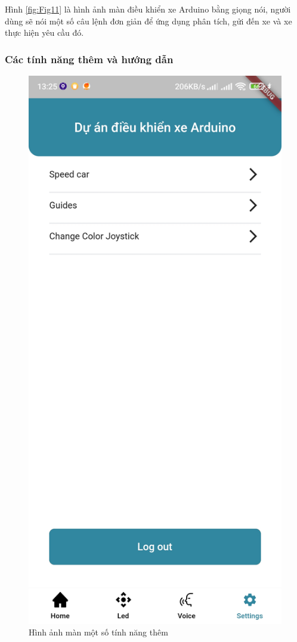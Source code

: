 \documentclass[../DoAn.tex]{subfiles}
\begin{document}
Hình \ref{fig:Fig11} là hình ảnh màn điều khiển xe Arduino bằng giọng nói, người dùng sẽ nói một số câu lệnh đơn giản để ứng dụng phân tích, gửi đến xe và xe thực hiện yêu cầu đó.

\subsubsection{Các tính năng thêm và hướng dẫn}

\begin{figure}[H]
    \centering
    \includegraphics[scale = 0.2]{Hinhve/app_4.jpg}
    \caption{Hình ảnh màn một số tính năng thêm}
    \label{fig:Fig12}
\end{figure}
\end{document}
